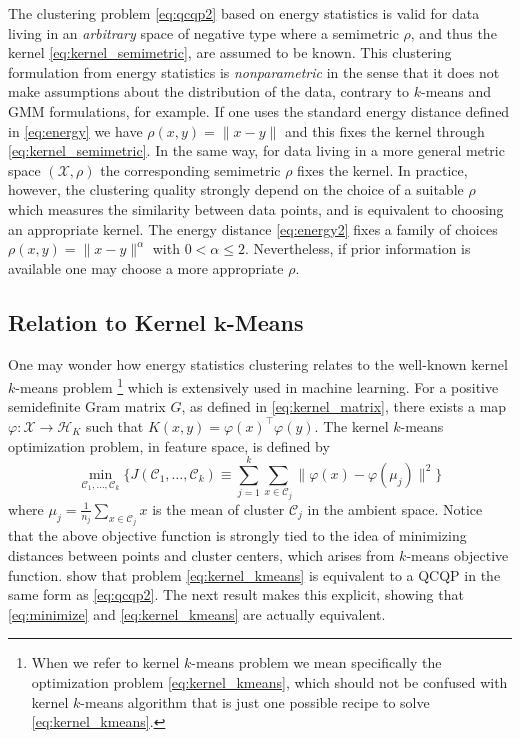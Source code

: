 \documentclass[aps,preprint,nofootinbib,floatfix]{revtex4-1}
\newcommand\kk{K}
\newcommand\HH{\mathcal{H}}
\newcommand\C{{\mathcal{C}}}
\begin{document}
The clustering problem \eqref{eq:qcqp2} based on energy statistics
is valid for data living in an \emph{arbitrary} space of negative type where
a semimetric $\rho$, and thus the kernel \eqref{eq:kernel_semimetric}, are
assumed to be known. 
This clustering 
formulation from energy statistics is 
\emph{nonparametric} in the sense that it does not make assumptions
about  the distribution of the data, 
contrary to $k$-means and GMM formulations, for example.
If one uses the standard energy distance
defined in \eqref{eq:energy} 
we have $\rho(x,y) = \| x - y\|$ and this fixes the kernel
through \eqref{eq:kernel_semimetric}. In the same way, 
for data living in a more general
metric space $(\mathcal{X}, \rho)$ the corresponding semimetric $\rho$ fixes
the kernel.
In practice, however,
the clustering quality strongly depend on the choice of a suitable
$\rho$ which measures the similarity between data points,
and is equivalent to choosing an appropriate kernel.
The energy distance \eqref{eq:energy2} fixes a family of choices
$\rho(x,y) = \| x-y\|^\alpha$ with $0 < \alpha\le 2$. 
Nevertheless, if prior information
is available one may choose a more appropriate $\rho$.

\subsection*{Relation to Kernel $\bm{k}$-Means}
One may wonder how energy statistics clustering 
relates to the well-known kernel $k$-means problem%
\footnote{When we refer to kernel $k$-means problem we mean specifically 
the optimization problem \eqref{eq:kernel_kmeans}, which should not be 
confused with kernel $k$-means algorithm that is just one possible recipe 
to solve \eqref{eq:kernel_kmeans}.
} 
which is extensively used in machine learning.
For a positive semidefinite Gram matrix $G$, as defined in
\eqref{eq:kernel_matrix},
there exists a map
$\varphi: \mathcal{X} \to \HH_\kk$ such that
$\kk(x,y) = \varphi(x)^\top \varphi(y)$. The kernel $k$-means optimization
problem,
in feature space,
is defined by
\begin{equation}
\label{eq:kernel_kmeans}
\min_{\C_1,\dotsc,\C_k}\bigg\{ 
J(\C_1,\dots,\C_k) \equiv  \sum_{j=1}^k
\sum_{x \in \C_j} \| \varphi(x) - \varphi(\mu_j) \|^2
\bigg\}
\end{equation}
where $\mu_j = \tfrac{1}{n_j} \sum_{x \in \C_j} x$ is the  mean of cluster
$\C_j$ in the ambient space. Notice that the above objective function
is strongly tied to the idea of minimizing distances between points
and cluster centers, which arises from $k$-means objective function.
 \cite{Dhillon2,Dhillon} show
that problem \eqref{eq:kernel_kmeans} 
is equivalent to a QCQP in the same form as
\eqref{eq:qcqp2}. The next result makes this explicit, showing that
\eqref{eq:minimize} and \eqref{eq:kernel_kmeans} are actually equivalent.
\end{document}
